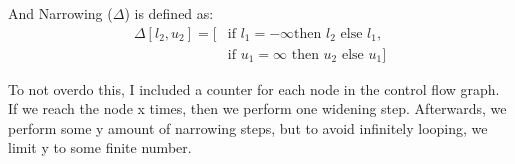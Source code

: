 And Narrowing ($\Delta$) is defined as:
\begin{align*}
  [l_1, u_1] \Delta [l_2, u_2] = [&\text{if } l_1 = -\infty \text{
  then } l_2 \text{ else } l_1, \\ 
  &\text{if } u_1 = \infty \text{ then }
  u_2 \text{ else } u_1]
\end{align*}

To not overdo this, I included a counter for each node in the control flow
graph. If we reach the node x times, then we perform one widening step.
Afterwards, we perform some y amount of narrowing steps, but to avoid
infinitely looping, we limit y to some finite number.


